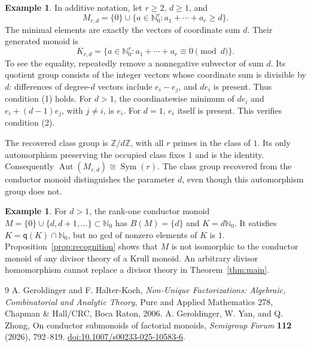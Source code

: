 \documentclass[11pt]{article}
\theoremstyle{definition}
\newtheorem{example}[theorem]{Example}
\newcommand{\q}{\mathsf q}
\newcommand{\Aut}{\operatorname{Aut}}
\newcommand{\Sym}{\operatorname{Sym}}
\begin{document}
\begin{example}\label{ex:threshold}
In additive notation, let $r\ge2$, $d\ge1$, and
\[
 M_{r,d}=\{0\}\cup\{a\in\mathbb N_0^r:a_1+\cdots+a_r\ge d\}.
\]
The minimal elements are exactly the vectors of coordinate sum $d$. Their generated monoid is
\[
 K_{r,d}=\{a\in\mathbb N_0^r:a_1+\cdots+a_r\equiv0\pmod d\}.
\]
To see the equality, repeatedly remove a nonnegative subvector of sum $d$. Its quotient group consists of the integer vectors whose coordinate sum is divisible by $d$: differences of degree-$d$ vectors include $e_i-e_j$, and $de_i$ is present. Thus condition (1) holds. For $d>1$, the coordinatewise minimum of $de_i$ and $e_i+(d-1)e_j$, with $j\ne i$, is $e_i$. For $d=1$, $e_i$ itself is present. This verifies condition (2).

The recovered class group is $\mathbb Z/d\mathbb Z$, with all $r$ primes in the class of $1$. Its only automorphism preserving the occupied class fixes $1$ and is the identity. Consequently $\Aut(M_{r,d})\cong\Sym(r)$. The class group recovered from the conductor monoid distinguishes the parameter $d$, even though this automorphism group does not.
\end{example}

\begin{example}\label{ex:rankone}
For $d>1$, the rank-one conductor monoid $M=\{0\}\cup\{d,d+1,\ldots\}\subset\mathbb N_0$ has $B(M)=\{d\}$ and $K=d\mathbb N_0$. It satisfies $K=\q(K)\cap\mathbb N_0$, but no gcd of nonzero elements of $K$ is $1$. Proposition~\ref{prop:recognition} shows that $M$ is not isomorphic to the conductor monoid of any divisor theory of a Krull monoid. An arbitrary divisor homomorphism cannot replace a divisor theory in Theorem~\ref{thm:main}.
\end{example}

\begin{thebibliography}{9}
 A. Geroldinger and F. Halter-Koch,
\emph{Non-Unique Factorizations: Algebraic, Combinatorial and Analytic Theory},
Pure and Applied Mathematics 278, Chapman \& Hall/CRC, Boca Raton, 2006.
 A. Geroldinger, W. Yan, and Q. Zhong,
On conductor submonoids of factorial monoids,
\emph{Semigroup Forum} \textbf{112} (2026), 792--819.
\href{https://doi.org/10.1007/s00233-025-10583-6}{doi:10.1007/s00233-025-10583-6}.
\end{thebibliography}
\end{document}
